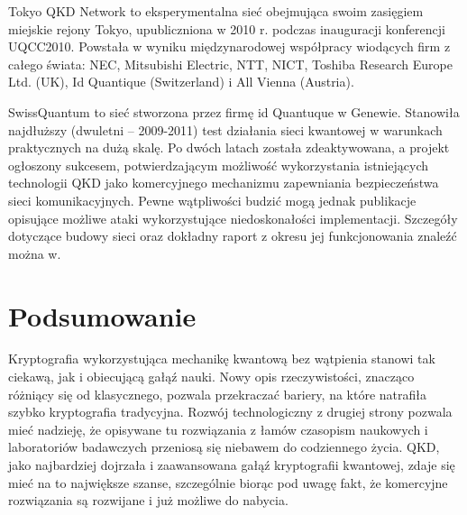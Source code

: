 \documentclass[10pt]{article}
\begin{document}

Tokyo QKD Network\cite{tokyo} to eksperymentalna sieć obejmująca swoim zasięgiem miejskie rejony
Tokyo, upubliczniona w 2010 r. podczas inauguracji konferencji UQCC2010\cite{uqqc2010}. Powstała 
w wyniku międzynarodowej współpracy wiodących firm z całego świata: NEC, Mitsubishi Electric, NTT, 
NICT, Toshiba Research Europe Ltd. (UK), Id Quantique (Switzerland) i All Vienna (Austria). 

SwissQuantum\cite{swissquantum} to sieć stworzona przez firmę id Quantuque w Genewie. Stanowiła 
najdłuższy (dwuletni -- 2009-2011) test działania sieci kwantowej w warunkach praktycznych na dużą
skalę. Po dwóch latach została zdeaktywowana, a projekt ogłoszony sukcesem, potwierdzającym
możliwość wykorzystania istniejących technologii QKD jako komercyjnego mechanizmu zapewniania
bezpieczeństwa sieci komunikacyjnych. Pewne wątpliwości budzić mogą jednak publikacje opisujące 
możliwe ataki wykorzystujące niedoskonałości implementacji\cite{Gerhardt11}. Szczegóły dotyczące
budowy sieci oraz dokładny raport z okresu jej funkcjonowania znaleźć można w\cite{Stucki11}.

\section{Podsumowanie}

Kryptografia wykorzystująca mechanikę kwantową bez wątpienia stanowi tak ciekawą, jak i obiecującą
gałąź nauki. Nowy opis rzeczywistości, znacząco różniący się od klasycznego, pozwala przekraczać
bariery, na które natrafiła szybko kryptografia tradycyjna. Rozwój technologiczny z drugiej strony
pozwala mieć nadzieję, że opisywane tu rozwiązania z łamów czasopism naukowych i laboratoriów 
badawczych przeniosą się niebawem do codziennego życia. QKD, jako najbardziej dojrzała i zaawansowana
gałąź kryptografii kwantowej, zdaje się mieć na to największe szanse, szczególnie biorąc pod uwagę
fakt, że komercyjne rozwiązania są rozwijane i już możliwe do nabycia.


\nocite{*}



\end{document}
